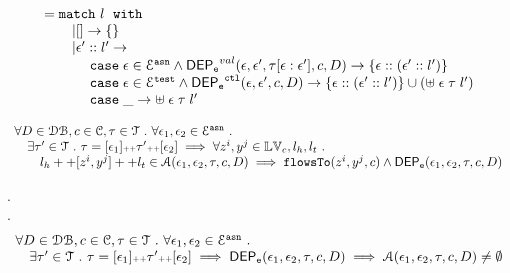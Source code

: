 \begin{defn}
\[\begin{array}{l}
	= 
	\ematch~  l ~ \ewith
	\\ \qquad
	| [] \to \{\}
	\\ \qquad
	|  \event' :: l' \to  
	\\ \quad \qquad 	
	\ecase \event \in \eventset^{\asn}  \land \eventdep^{val}(\event, \event', \trace[\event:\event'], c, D)
	\to \left\{ \event::(\event' :: l') \right\}
	\\ \quad \qquad 	
	\ecase \event \in \eventset^{\test} \land \eventdep^{\ctl}(\event, \event', c, D)
	\to \left\{ \event::(\event' :: l') \right\}\cup 
	\left( \uplus \eapp  \event  \eapp \trace  \eapp l' \right)
	\\ \quad \qquad 	
	\ecase \_ \to \uplus \eapp  \event  \eapp \trace  \eapp l'  
\end{array}
\]
\end{defn}
%
\begin{thm}
\label{thm:alg_correct}
\[
\begin{array}{l}
  \forall D \in \mathcal{DB} , c \in \mathcal{C}, \mathtt{\tau} \in \mathcal{T} ~.~ \forall \mathtt{\epsilon}_1, \mathtt{\epsilon}_2 \in \mathcal{E}^{\mathtt{{asn}}} ~.~
  \\ \quad 
   \exists \mathtt{\tau}' \in \mathcal{T} ~.~ \mathtt{\tau} = [\mathtt{\epsilon}_1] {\scriptscriptstyle ++} \mathtt{\tau}' {\scriptscriptstyle ++} [\mathtt{\epsilon}_2]
   \implies    \forall  z^i, y^j \in \mathbb{LV}_c, l_h, l_t ~.~ 
  \\ \qquad 
   l_h ++ [z^i, y^j] ++ l_t \in \mathcal{A}(\mathtt{\epsilon}_1, \mathtt{\epsilon}_2, \mathtt{\tau}, c, D)
   \implies \mathtt{flowsTo}(z^i, y^j, c) \land \mathsf{DEP_{\mathtt{e}}}(\mathtt{\epsilon}_1, \mathtt{\epsilon}_2, \mathtt{\tau}, {c}, D)
\end{array}
\]
\end{thm}
%
%
\begin{thm}.
\\
\label{thm:algeventdep_sound}.
\[
\begin{array}{l}
	\forall D \in \mathcal{DB} , c \in \mathcal{C}, \mathtt{\tau} \in \mathcal{T} ~.~ \forall \mathtt{\epsilon}_1, \mathtt{\epsilon}_2 \in \mathcal{E}^{\mathtt{{asn}}} ~.~
	\\ \quad 
   \exists \mathtt{\tau}' \in \mathcal{T} ~.~ \mathtt{\tau} = [\mathtt{\epsilon}_1] {\scriptscriptstyle ++} \mathtt{\tau}' {\scriptscriptstyle ++} [\mathtt{\epsilon}_2]
  \implies \mathsf{DEP_{\mathtt{e}}}(\mathtt{\epsilon}_1, \mathtt{\epsilon}_2, \mathtt{\tau}, {c}, D)
   \implies
   \mathcal{A}(\mathtt{\epsilon}_1, \mathtt{\epsilon}_2, \mathtt{\tau}, c, D) \neq \emptyset
\end{array}
\]
\end{thm}
%
